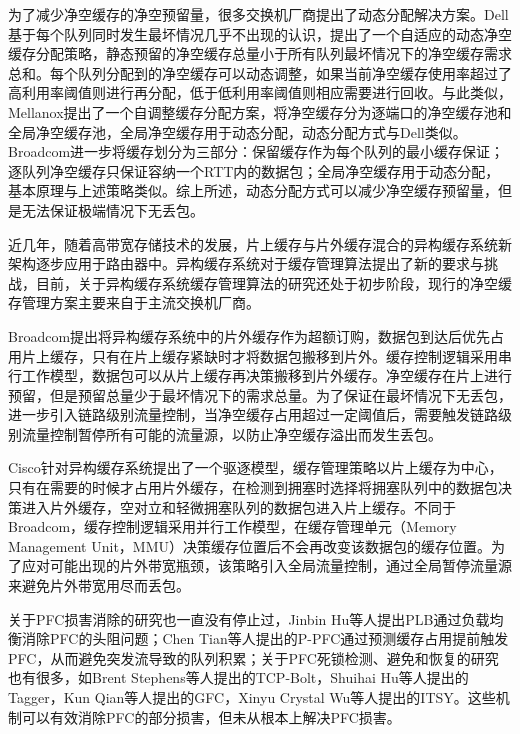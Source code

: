 为了减少净空缓存的净空预留量，很多交换机厂商提出了动态分配解决方案。Dell基于每个队列同时发生最坏情况几乎不出现的认识，提出了一个自适应的动态净空缓存分配策略\cite{selfTuningBufferAllocation}，静态预留的净空缓存总量小于所有队列最坏情况下的净空缓存需求总和。每个队列分配到的净空缓存可以动态调整，如果当前净空缓存使用率超过了高利用率阈值则进行再分配，低于低利用率阈值则相应需要进行回收。与此类似，Mellanox提出了一个自调整缓存分配方案\cite{adaptiveHeadroomAllocation}，将净空缓存分为逐端口的净空缓存池和全局净空缓存池，全局净空缓存用于动态分配，动态分配方式与Dell类似。Broadcom进一步将缓存划分为三部分\cite{adaptiveThresholding}：保留缓存作为每个队列的最小缓存保证；逐队列净空缓存只保证容纳一个RTT内的数据包；全局净空缓存用于动态分配，基本原理与上述策略类似。综上所述，动态分配方式可以减少净空缓存预留量，但是无法保证极端情况下无丢包。


近几年，随着高带宽存储技术的发展，片上缓存与片外缓存混合的异构缓存系统新架构逐步应用于路由器中。异构缓存系统对于缓存管理算法提出了新的要求与挑战，目前，关于异构缓存系统缓存管理算法的研究还处于初步阶段，现行的净空缓存管理方案主要来自于主流交换机厂商。

Broadcom提出将异构缓存系统中的片外缓存作为超额订购\cite{BCM88480}，数据包到达后优先占用片上缓存，只有在片上缓存紧缺时才将数据包搬移到片外。缓存控制逻辑采用串行工作模型，数据包可以从片上缓存再决策搬移到片外缓存。净空缓存在片上进行预留，但是预留总量少于最坏情况下的需求总量。为了保证在最坏情况下无丢包，进一步引入链路级别流量控制，当净空缓存占用超过一定阈值后，需要触发链路级别流量控制暂停所有可能的流量源，以防止净空缓存溢出而发生丢包。

Cisco针对异构缓存系统提出了一个驱逐模型\cite{CiscoNcs5500}，缓存管理策略以片上缓存为中心，只有在需要的时候才占用片外缓存，在检测到拥塞时选择将拥塞队列中的数据包决策进入片外缓存，空对立和轻微拥塞队列的数据包进入片上缓存。不同于Broadcom，缓存控制逻辑采用并行工作模型，在缓存管理单元（Memory Management Unit，MMU）决策缓存位置后不会再改变该数据包的缓存位置。为了应对可能出现的片外带宽瓶颈，该策略引入全局流量控制，通过全局暂停流量源来避免片外带宽用尽而丢包。


关于PFC损害消除的研究也一直没有停止过，Jinbin Hu等人提出PLB\cite{hu2022load}通过负载均衡消除PFC的头阻问题；Chen Tian等人提出的P-PFC\cite{TPDS20P-PFC}通过预测缓存占用提前触发PFC，从而避免突发流导致的队列积累；关于PFC死锁检测、避免和恢复的研究也有很多，如Brent Stephens等人提出的TCP-Bolt\cite{INFOCOM14TCP-Bolt}，Shuihai Hu等人提出的Tagger\cite{CoNEXT17Tagger}，Kun Qian等人提出的GFC\cite{SIGCOMM19GFC}，Xinyu Crystal Wu等人提出的ITSY\cite{INFOCOM22ITSY}。这些机制可以有效消除PFC的部分损害，但未从根本上解决PFC损害。


